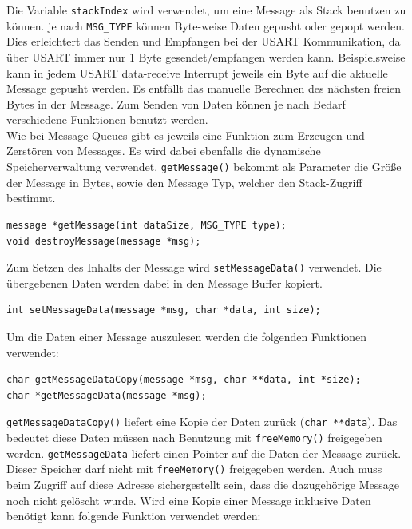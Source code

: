 \documentclass[fontsize=12pt, toc=bibliography, notitlepage]{scrreprt}
\begin{document}
Die Variable \lstinline$stackIndex$ wird verwendet, um eine Message als Stack benutzen zu können. je nach \lstinline$MSG_TYPE$ können Byte-weise Daten gepusht oder gepopt werden. Dies erleichtert das Senden und Empfangen bei der USART Kommunikation, da über USART immer nur 1 Byte gesendet/empfangen werden kann. Beispielsweise kann in jedem USART data-receive Interrupt jeweils ein Byte auf die aktuelle Message gepusht werden. Es entfällt das manuelle Berechnen des nächsten freien Bytes in der Message. Zum Senden von Daten können je nach Bedarf verschiedene Funktionen benutzt werden.\\

Wie bei Message Queues gibt es jeweils eine Funktion zum Erzeugen und Zerstören von Messages. Es wird dabei ebenfalls die dynamische Speicherverwaltung verwendet. \lstinline$getMessage()$ bekommt als Parameter die Größe der Message in Bytes, sowie den Message Typ, welcher den Stack-Zugriff bestimmt.

\begin{lstlisting}
message *getMessage(int dataSize, MSG_TYPE type);
void destroyMessage(message *msg);
\end{lstlisting}

Zum Setzen des Inhalts der Message wird \lstinline$setMessageData()$ verwendet. Die übergebenen Daten werden dabei in den Message Buffer kopiert.

\begin{lstlisting}
int setMessageData(message *msg, char *data, int size);
\end{lstlisting}

Um die Daten einer Message auszulesen werden die folgenden Funktionen verwendet:

\begin{lstlisting}
char getMessageDataCopy(message *msg, char **data, int *size);
char *getMessageData(message *msg);
\end{lstlisting}

\newpage

\lstinline$getMessageDataCopy()$ liefert eine Kopie der Daten zurück (\lstinline$char **data$). Das bedeutet diese Daten müssen nach Benutzung mit \lstinline$freeMemory()$  freigegeben werden. \lstinline$getMessageData$ liefert einen Pointer auf die Daten der Message zurück. Dieser Speicher darf nicht mit \lstinline$freeMemory()$  freigegeben werden. Auch muss beim Zugriff auf diese Adresse sichergestellt sein, dass die dazugehörige Message noch nicht gelöscht wurde. Wird eine Kopie einer Message inklusive Daten benötigt kann folgende Funktion verwendet werden:
\end{document}
